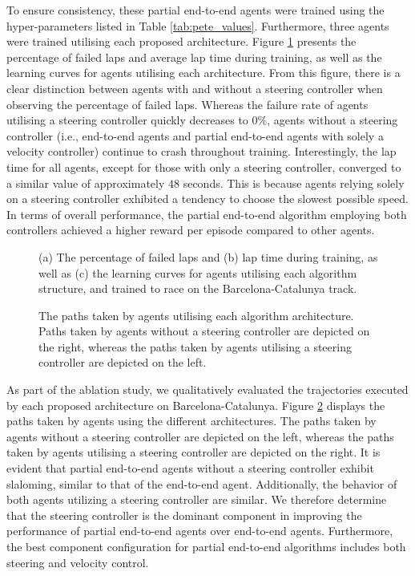 To ensure consistency, these partial end-to-end agents were trained using the hyper-parameters listed in Table \ref{tab:pete_values}.
Furthermore, three agents were trained utilising each proposed architecture.
Figure \ref{fig:architecture_train} presents the percentage of failed laps and average lap time during training, as well as the learning curves for agents utilising each architecture.
From this figure, there is a clear distinction between agents with and without a steering controller when observing the percentage of failed laps.
Whereas the failure rate of agents utilising a steering controller quickly decreases to $0\%$, agents without a steering controller (i.e., end-to-end agents and partial end-to-end agents with solely a velocity controller) continue to crash throughout training.
Interestingly, the lap time for all agents, except for those with only a steering controller, converged to a similar value of approximately $48$ seconds. 
This is because agents relying solely on a steering controller exhibited a tendency to choose the slowest possible speed.
In terms of overall performance, the partial end-to-end algorithm employing both controllers achieved a higher reward per episode compared to other agents. 

\begin{figure}[htb!]
    \centering
    
    \caption[Learning curves for agents utilising each algorithm structure]{(a) The percentage of failed laps and (b) lap time during training, as well as (c) the learning curves for agents utilising each algorithm structure, and trained to race on the Barcelona-Catalunya track.}
    \label{fig:architecture_train}
\end{figure}

\begin{figure}[htb!]
    \centering
    
    \caption[Paths taken by agents utilising each algorithm architecture]{The paths taken by agents utilising each algorithm architecture. Paths taken by agents without a steering controller are depicted on the right, whereas the paths taken by agents utilising a steering controller are depicted on the left.}
    \label{fig:architecture_esp}
\end{figure}

As part of the ablation study, we qualitatively evaluated the trajectories executed by each proposed architecture on Barcelona-Catalunya.
Figure \ref{fig:architecture_esp} displays the paths taken by agents using the different architectures.
The paths taken by agents without a steering controller are depicted on the left, whereas the paths taken by agents utilising a steering controller are depicted on the right.
It is evident that partial end-to-end agents without a steering controller exhibit slaloming, similar to that of the end-to-end agent. 
Additionally, the behavior of both agents utilizing a steering controller are similar.
We therefore determine that the steering controller is the dominant component in improving the performance of partial end-to-end agents over end-to-end agents. 
Furthermore, the best component configuration for partial end-to-end algorithms includes both steering and velocity control.

